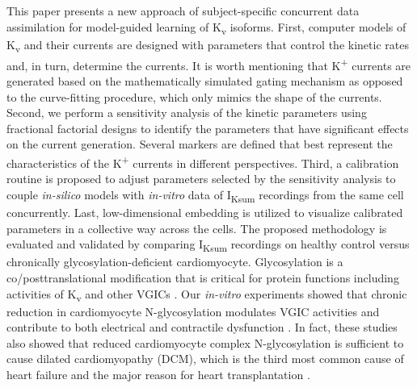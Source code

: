 \documentclass[11pt]{article}
\begin{document}
This paper presents a new approach of subject-specific concurrent data assimilation for model-guided learning of K\textsubscript{v} isoforms. First, computer models of K\textsubscript{v} and their currents are designed with parameters that control the kinetic rates and, in turn, determine the currents. It is worth mentioning that K\textsuperscript{+} currents are generated based on the mathematically simulated gating mechanism as opposed to the curve-fitting procedure, which only mimics the shape of the currents. Second, we perform a sensitivity analysis of the kinetic parameters using fractional factorial designs to identify the parameters that have significant effects on the current generation. Several markers are defined that best represent the characteristics of the K\textsuperscript{+} currents in different perspectives. Third, a calibration routine is proposed to adjust parameters selected by the sensitivity analysis to couple \textit{in-silico} models with \textit{in-vitro} data of I\textsubscript{Ksum} recordings from the same cell concurrently. Last, low-dimensional embedding is utilized to visualize calibrated parameters in a collective way across the cells. The proposed methodology is evaluated and validated by comparing I\textsubscript{Ksum} recordings on healthy control versus chronically glycosylation-deficient cardiomyocyte. Glycosylation is a co/posttranslational modification that is critical for protein functions including activities of K\textsubscript{v} and other VGICs \citep{ohtsubo2006glycosylation,ednie2012modulation}. Our \textit{in-vitro} experiments showed that chronic reduction in cardiomyocyte N-glycosylation modulates VGIC activities and contribute to both electrical and contractile dysfunction \citep{ednie2013sialicNav1,ednie2015sialicKv,ednie2019reduced,ednie2019reduced2}. In fact, these studies also showed that reduced cardiomyocyte complex N-glycosylation is sufficient to cause dilated cardiomyopathy (DCM), which is the third most common cause of heart failure and the major reason for heart transplantation \citep{weintraub2017dilated}.
\end{document}
